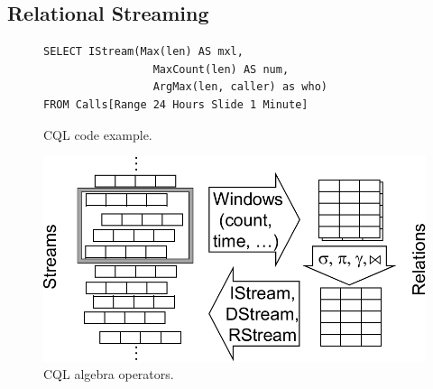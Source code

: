 \subsection{Relational Streaming}\label{sec:sql} %

\begin{figure}[!h]
\begin{lstlisting}
SELECT IStream(Max(len) AS mxl,
                 MaxCount(len) AS num,
                 ArgMax(len, caller) as who)
FROM Calls[Range 24 Hours Slide 1 Minute]
\end{lstlisting}
\vspace*{-4mm}
\caption{\label{fig:cql}CQL code example.}
\end{figure}

\begin{figure}
\centerline{\includegraphics[scale=0.5]{cqlops.pdf}}
\vspace*{-4mm}
\caption{\label{fig:cqlops}CQL algebra operators.}
\end{figure}

